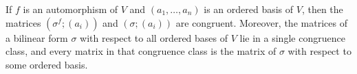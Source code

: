 If $f$ is an automorphism of $V$ and $(a_1, \ldots, a_n)$ is an ordered basis of $V$, then the matrices $(\sigma^f; (a_i))$ and $(\sigma; (a_i))$ are congruent. Moreover, the matrices of a bilinear form $\sigma$ with respect to all ordered bases of $V$ lie in a single congruence class, and every matrix in that congruence class is the matrix of $\sigma$ with respect to some ordered basis.
